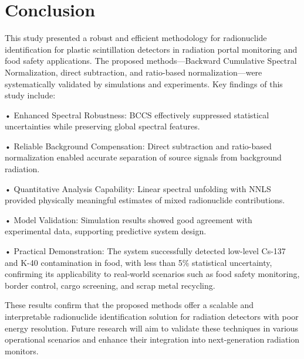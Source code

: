 \documentclass[10pt]{wlscirep}
\begin{document}
\section*{Conclusion}

This study presented a robust and efficient methodology for radionuclide identification for plastic scintillation detectors in radiation portal monitoring and food safety applications. The proposed methods—Backward Cumulative Spectral Normalization, direct subtraction, and ratio-based normalization—were systematically validated by simulations and experiments. Key findings of this study include:

• Enhanced Spectral Robustness: BCCS effectively suppressed statistical uncertainties while preserving global spectral features.

• Reliable Background Compensation: Direct subtraction and ratio-based normalization enabled accurate separation of source signals from background radiation.

• Quantitative Analysis Capability: Linear spectral unfolding with NNLS provided physically meaningful estimates of mixed radionuclide contributions.

• Model Validation: Simulation results showed good agreement with experimental data, supporting predictive system design.

• Practical Demonstration: The system successfully detected low-level Cs-137 and K-40 contamination in food, with less than 5\% statistical uncertainty, confirming its applicability to real-world scenarios such as food safety monitoring, border control, cargo screening, and scrap metal recycling.

These results confirm that the proposed methods offer a scalable and interpretable radionuclide identification solution for radiation detectors with poor energy resolution. Future research will aim to validate these techniques in various operational scenarios and enhance their integration into next-generation radiation monitors.



\end{document}
